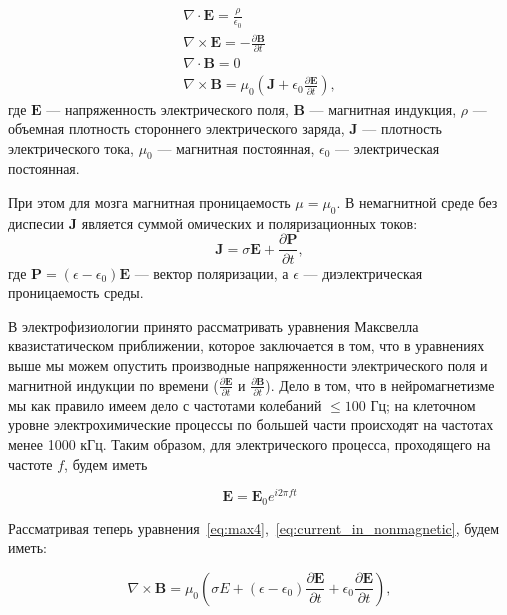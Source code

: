 \begin{gather}
    \nabla \cdot \mathbf{E} = \frac{\rho}{\epsilon_0} \label{eq:max1} \\
    \nabla \times \mathbf{E} = {-\frac{\partial \mathbf{B}}{\partial t}} \label{eq:max2} \\
    \nabla \cdot \mathbf{B} = 0 \label{eq:max3} \\
    \nabla \times \mathbf{B} = \mu_0 (\mathbf{J} + \epsilon_0 \frac{\partial \mathbf{E}}{\partial t}) \label{eq:max4},
\end{gather}
где $\mathbf{E}$ --- напряженность электрического поля, $\mathbf{B}$ --- магнитная индукция,
$\rho$ --- объемная плотность стороннего электрического заряда,
$\mathbf{J}$ --- плотность электрического тока,
$\mu_0$ --- магнитная постоянная,
$\epsilon_0$ --- электрическая постоянная.



При этом для мозга магнитная проницаемость $\mu = \mu_0$.
В немагнитной среде без диспесии $\mathbf{J}$ является суммой омических и поляризационных токов:
\begin{equation}
    \mathbf{J} = \sigma \mathbf{E} + \frac{\partial \mathbf{P}}{\partial t},
    \label{eq:current_in_nonmagnetic}
\end{equation}
где $\mathbf{P} = (\epsilon - \epsilon_0) \mathbf{E}$ --- вектор поляризации,
а $\epsilon$ --- диэлектрическая проницаемость среды.

В электрофизиологии принято рассматривать уравнения  Максвелла квазистатическом приближении, которое
заключается в том, что в уравнениях выше мы можем опустить производные напряженности
электрического поля и магнитной индукции по времени
($\frac{\partial \mathbf{E}}{\partial t}$ и $\frac{\partial \mathbf{B}}{\partial t}$).
Дело в том, что в нейромагнетизме мы как правило имеем дело с частотами колебаний $\leq 100$ Гц;
на клеточном уровне электрохимические процессы по большей части происходят на частотах менее 1000 кГц.
Таким образом, для электрического процесса, проходящего на частоте $f$, будем иметь

\begin{equation}
    \mathbf{E} = \mathbf{E}_0 e^{i2\pi ft}
\end{equation}

Рассматривая теперь уравнения~\ref{eq:max4},~\ref{eq:current_in_nonmagnetic}, будем иметь:

\begin{equation}
    \nabla \times \mathbf{B} = \mu_0 (\sigma E +
    (\epsilon - \epsilon_0) \frac{\partial \mathbf{E}}{\partial t} +
    \epsilon_0 \frac{\partial \mathbf{E}}{\partial t}),
\end{equation}

